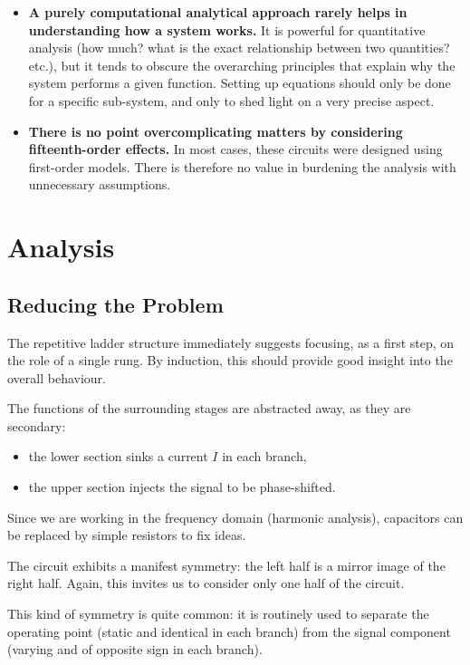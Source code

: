 \documentclass[10pt]{article}
\begin{document}
\begin{itemize}
  \item \textbf{A purely computational analytical approach rarely helps in understanding how a system works.}
  It is powerful for quantitative analysis (how much? what is the exact relationship between two quantities? etc.),
  but it tends to obscure the overarching principles that explain why the system performs a given function.
  Setting up equations should only be done for a specific sub-system, and only to shed light on a very precise aspect.

  \item \textbf{There is no point overcomplicating matters by considering fifteenth-order effects.}
  In most cases, these circuits were designed using first-order models.
  There is therefore no value in burdening the analysis with unnecessary assumptions.
\end{itemize}


\section*{Analysis}

\subsection*{Reducing the Problem}

The repetitive ladder structure immediately suggests focusing, as a first step, on the role of a single rung.
By induction, this should provide good insight into the overall behaviour.

The functions of the surrounding stages are abstracted away, as they are secondary:
\begin{itemize}
  \item the lower section sinks a current $I$ in each branch,
  \item the upper section injects the signal to be phase-shifted.
\end{itemize}

Since we are working in the frequency domain (harmonic analysis), capacitors can be replaced by simple resistors to fix ideas.

The circuit exhibits a manifest symmetry: the left half is a mirror image of the right half.
Again, this invites us to consider only one half of the circuit.

This kind of symmetry is quite common: it is routinely used to separate the operating point
(static and identical in each branch) from the signal component (varying and of opposite sign in each branch).
\end{document}
